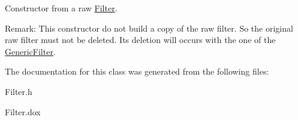 Constructor from a raw \mbox{\hyperlink{classHurricane_1_1Filter}{Filter}}.

\begin{DoxyParagraph}{Remark\+: This constructor do not build a copy of the raw filter. So the original}
raw filter must not be deleted. It\textquotesingle{}s deletion will occurs with the one of the \mbox{\hyperlink{classHurricane_1_1GenericFilter}{Generic\+Filter}}. 
\end{DoxyParagraph}


The documentation for this class was generated from the following files\+:\begin{DoxyCompactItemize}
\item 
Filter.\+h\item 
Filter.\+dox\end{DoxyCompactItemize}

